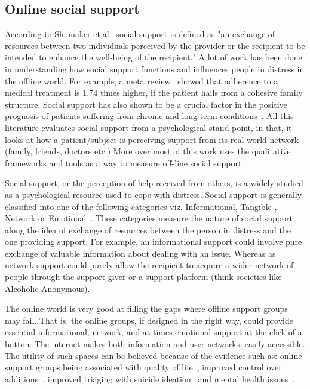 \subsection{Online social support}
According to Shumaker et.al~\cite{shumaker1984toward} social support is defined as "an exchange of resources between two individuals perceived by the provider or the recipient to be intended to enhance the well‐being of the recipient."
A lot of work has been done in understanding how social support functions and influences people in distress in the offline world. For example, a meta review~\cite{dimatteo2004social} showed that adherence to a medical treatment is 1.74 times higher, if the patient hails from a cohesive family structure. Social support has also shown to be a crucial factor in the positive prognosis of patients suffering from chronic and long term conditions~\cite{sacco2006diabetes,peirce2000longitudinal,brown1986social,collins1993social,dunkel1984social,baron1990social}. All this literature evaluates social support from a psychological stand point, in that, it looks at how a patient/subject is perceiving support from its real world network (family, friends, doctors etc.) More over most of this work uses the qualitative frameworks and tools as a way to measure off-line social support. 

Social support, or the perception of help received from others, is a widely studied as a psychological resource used to cope with distress. 
Social support is generally classified into one of the following categories viz. Informational, Tangible , Network or Emotional~\cite{cutrona1992controllability}. These categories measure the nature of social support along the idea of exchange of resources between the person in distress and the one providing support. For example, an informational support could involve pure exchange of valuable information about dealing with an issue. Whereas as network support could purely allow the recipient to acquire a wider network of people through the support giver or a support platform (think societies like Alcoholic Anonymous). 

The online world is very good at filling the gaps where offline support groups may fail. That is, the online groups, if designed in the right way, could provide essential informational, network, and at times emotional support at the click of a button. The internet makes both information and user networks, easily accessible. The utility of such spaces can be believed because of the evidence such as: online support groups being associated with quality of life~\cite{idriss2009role,nambisan2011information,coulson2005receiving}, improved control over additions~\cite{wood2009evaluation}, improved triaging with suicide ideation~\cite{languageChoudhury} and mental health issues~\cite{kummervold2002social}. 

